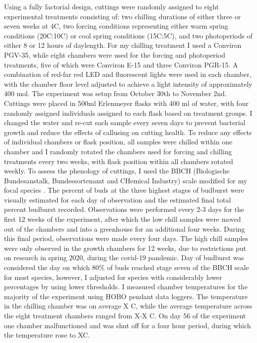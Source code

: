 \documentclass{article}\usepackage[]{graphicx}\usepackage[]{color}
\begin{document}
Using a fully factorial design, cuttings were randomly assigned to eight experimental treatments consisting of: two chilling durations of either three or seven weeks at 4\textdegree{}C, two forcing conditions representing either warm spring conditions (20\textdegree{}C:10\textdegree{}C) or cool spring conditions (15\textdegree{}C:5\textdegree{}C), and two photoperiods of either 8 or 12 hours of daylength. For my chilling treatment I used a Conviron PGV-35, while eight chambers were used for the forcing and photoperiod treatments, five of which were Conviron E-15 and three Conviron PGR-15. A combination of red-far red LED and fluorescent lights were used in each chamber, with the chamber floor level adjusted to achieve a light intensity of approximately 400 \mu mol. The experiment was setup from October 30th to November 2nd. Cuttings were placed in 500ml Erlenmeyer flasks with 400 ml of water, with four randomly assigned individuals assigned to each flask based on treatment groups. I changed the water and re-cut each sample every seven days to prevent bacterial growth and reduce the effects of callusing on cutting health. To reduce any effects of individual chambers or flask position, all samples were chilled within one chamber and I randomly rotated the chambers used for forcing and chilling treatments every two weeks, with flask position within all chambers rotated weekly. To assess the phenology of cuttings, I used the BBCH (Biologische Bundesanstalk, Bundessortenamt and CHemical Industry) scale modified for my focal species \citep{Finn2007}. The percent of buds at the three highest stages of budburst were visually estimated for each day of observation and the estimated final total percent budburst recorded. Observations were performed every 2-3 days for the first 12 weeks of the experiment, after which the low chill samples were moved out of the chambers and into a greenhouse for an additional four weeks. During this final period, observations were made every four days. The high chill samples were only observed in the growth chambers for 12 weeks, due to restrictions put on research in spring 2020, during the covid-19 pandemic. Day of budburst was considered the day on which 80\% of buds reached stage seven of the BBCH scale for most species, however, I adjusted for species with considerably lower percentages by using lower thresholds. I measured chamber temperatures for the majority of the experiment using HOBO pendant data loggers. The temperature in the chilling chamber was on average X \textdegree{}C, while the average temperature across the eight treatment chambers ranged from X-X \textdegree{}C. On day 56 of the experiment one chamber malfunctioned and was shut off for a four hour period, during which the temperature rose to X\textdegree{}C. 
\end{document}
